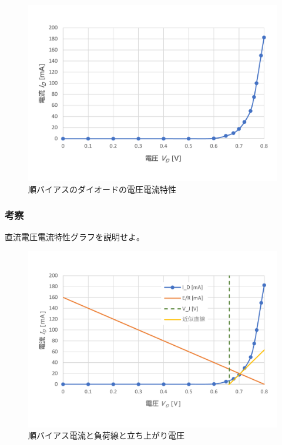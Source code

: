   \begin{figure}[!h]
    \centering
    \includegraphics[width=13cm]{./figs/G-forward_bias_ID-VD.pdf}
    \caption{順バイアスのダイオードの電圧電流特性}
    \label{fig:forward_bias_ID-VD}
  \end{figure}

\newpage%
\subsubsection{考察}
  直流電圧電流特性グラフを説明せよ。\\

  \begin{figure}[!h]
    \centering
    \includegraphics[width=13cm]{./figs/G-forward_discussion.pdf}
    \caption{順バイアス電流と負荷線と立ち上がり電圧}
    \label{fig:forward_discussion}
  \end{figure}
  
